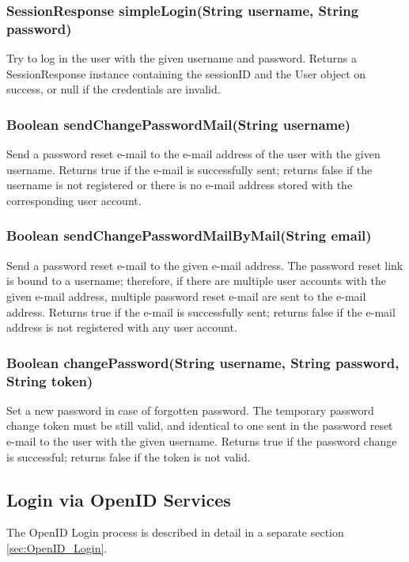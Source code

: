 \subsubsection{SessionResponse simpleLogin(String username, String password)}
Try to log in the user with the given username and password.
Returns a SessionResponse instance containing the sessionID and the User object on success, or null if the credentials are invalid.

\subsubsection{Boolean sendChangePasswordMail(String username)}
Send a password reset e-mail
to the e-mail address of the user with the given username.
Returns true if the e-mail is successfully sent;
returns false if the username is not registered or there is no e-mail address stored with the corresponding user account.

\subsubsection{Boolean sendChangePasswordMailByMail(String email)}
Send a password reset e-mail to the given e-mail address.
The password reset link is bound to a username;
therefore, if there are multiple user accounts with the given e-mail address,
multiple password reset e-mail are sent to the e-mail address.
Returns true if the e-mail is successfully sent;
returns false if the e-mail address is not registered with any user account.

\subsubsection{Boolean changePassword(String username, String password, String token)}
Set a new password in case of forgotten password.
The temporary password change token must be still valid,
and identical to one sent in the password reset e-mail
to the user with the given username.
Returns true if the password change is successful;
returns false if the token is not valid.

\subsection{Login via OpenID Services}
\label{subsubsec:gui_openid}

The OpenID Login process is described in detail in a separate section \ref{sec:OpenID_Login}.

